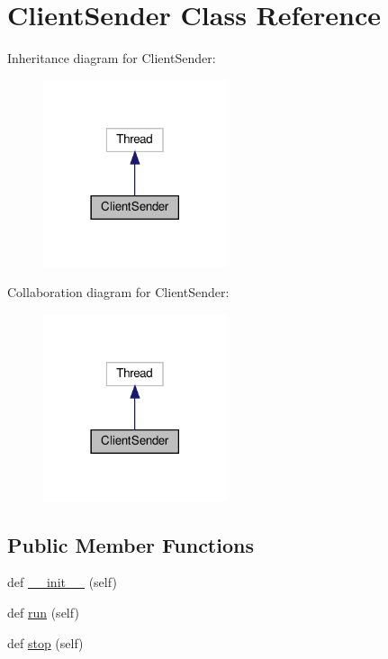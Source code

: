 \hypertarget{class_client_1_1_client_sender}{}\section{Client\+Sender Class Reference}
\label{class_client_1_1_client_sender}


Inheritance diagram for Client\+Sender\+:
\nopagebreak
\begin{figure}[H]
\begin{center}
\leavevmode
\includegraphics[width=153pt]{class_client_1_1_client_sender__inherit__graph}
\end{center}
\end{figure}


Collaboration diagram for Client\+Sender\+:
\nopagebreak
\begin{figure}[H]
\begin{center}
\leavevmode
\includegraphics[width=153pt]{class_client_1_1_client_sender__coll__graph}
\end{center}
\end{figure}
\subsection*{Public Member Functions}
\begin{DoxyCompactItemize}
\item 
def \hyperlink{class_client_1_1_client_sender_ae64f0875afe3067b97ba370b354b9213}{\+\_\+\+\_\+init\+\_\+\+\_\+} (self)
\item 
def \hyperlink{class_client_1_1_client_sender_ad22709b2e67308af35f55680d5a026e0}{run} (self)
\item 
def \hyperlink{class_client_1_1_client_sender_a26ca7c1c7fcdd35378e7be97727047a6}{stop} (self)
\end{DoxyCompactItemize}
